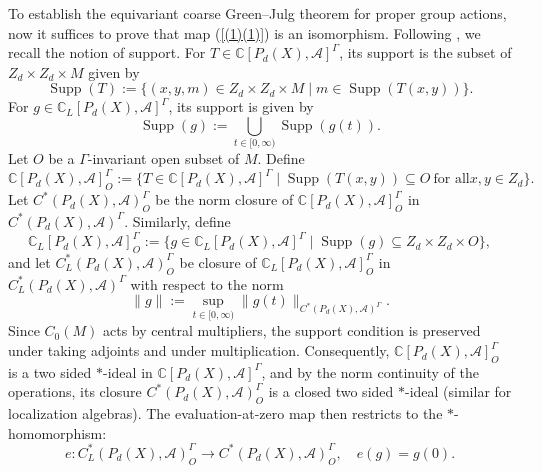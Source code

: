 \documentclass[pdflatex]{sn-jnl}
\theoremstyle{plain}
\theoremstyle{definition}
\begin{document}
To establish the equivariant coarse Green--Julg theorem for proper group actions, now it suffices to prove that map (\ref{(1)(1)}) is an isomorphism.
Following \cite{SW07}, we recall the notion of support. For $T\in\mathbb{C}[P_{d}(X),\mathcal{A}]^{\Gamma}$, its support is the subset of $Z_{d}\times Z_{d}\times M$ given by
\[
\operatorname{Supp}(T):=\{(x,y,m)\in Z_{d}\times Z_{d}\times M\mid m \in\operatorname{Supp}(T(x, y))\}.
\]
For $g\in\mathbb{C}_L[P_{d}(X),\mathcal{A}]^{\Gamma}$, its support is given by
\[
\operatorname{Supp}(g):=\bigcup_{t\in [0,\infty)}\operatorname{Supp}(g(t)).
\]
Let $O$ be a $\Gamma$-invariant open subset of $M$. Define
\[
\mathbb{C}[P_{d}(X),\mathcal{A}]_{O}^{\Gamma}:=\big\{T \in\mathbb{C}[P_{d}(X),\mathcal{A}]^{\Gamma}\mid \operatorname{Supp}(T(x,y))\subseteq O \ \text{for all}x,y\in Z_{d}\big\}.\]
Let $C^{*}(P_{d}(X),\mathcal{A})_O^{\Gamma}$ be the norm closure of $\mathbb{C}[P_{d}(X),\mathcal{A}]_O^{\Gamma}$ in $C^{*}(P_{d}(X),\mathcal{A})^{\Gamma}$.
Similarly, define
\[
\mathbb{C}_L[P_{d}(X),\mathcal{A}]_O^{\Gamma}:=\big\{g \in\mathbb{C}_L[P_{d}(X),\mathcal{A}]^{\Gamma}\mid\operatorname{Supp}(g)\subseteq Z_{d}\times Z_{d}\times O\big\},
\]
and let $C^{*}_L(P_{d}(X),\mathcal{A})_O^{\Gamma}$ be closure of $\mathbb{C}_L[P_{d}(X),\mathcal{A}]_O^{\Gamma}$ in $C^{*}_L(P_{d}(X),\mathcal{A})^{\Gamma}$ with respect to the norm
\[
\|g\|:=\sup_{t\in [0,\infty)}\|g(t)\|_{C^{*}(P_{d}(X),\mathcal{A})^{\Gamma}}.
\]
Since $C_0(M)$ acts by central multipliers, the support condition is preserved under taking adjoints and under multiplication. Consequently, $\mathbb{C}[P_{d}(X),\mathcal{A}]_O^{\Gamma}$ is a two sided $*$-ideal in $\mathbb{C}[P_{d}(X),\mathcal{A}]^{\Gamma}$, and by the norm continuity of the operations, its closure $C^{*}(P_{d}(X),\mathcal{A})_O^{\Gamma}$ is a closed two sided $*$-ideal (similar for localization algebras).
The evaluation-at-zero map then restricts to the $*$-homomorphism:
\[
e:C^{*}_L(P_{d}(X),\mathcal{A})_O^{\Gamma}\longrightarrow C^{*}(P_{d}(X),\mathcal{A})_O^{\Gamma},\quad e(g)=g(0).
\]
\end{document}
